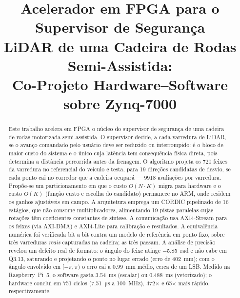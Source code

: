 \documentclass[conference]{IEEEtran}
\begin{document}
\title{Acelerador em FPGA para o Supervisor de Seguran\c{c}a\\
LiDAR de uma Cadeira de Rodas Semi-Assistida:\\
Co-Projeto Hardware--Software sobre Zynq-7000}

\author{
\and
{}
}

\maketitle

\begin{abstract}
Este trabalho acelera em FPGA o n\'ucleo do supervisor de seguran\c{c}a de uma
cadeira de rodas motorizada semi-assistida. O supervisor decide, a cada varredura
de LiDAR, se o avan\c{c}o comandado pelo usu\'ario deve ser reduzido ou
interrompido: \'e o bloco de maior custo do sistema e o \'unico cuja lat\^encia
tem consequ\^encia f\'isica direta, pois determina a dist\^ancia percorrida antes
da frenagem. O algoritmo projeta os \num{720} feixes da varredura no referencial
do ve\'iculo e testa, para \num{19} dire\c{c}\~oes candidatas de desvio, se cada
ponto cai no corredor que a cadeira ocupar\'a --- \num{9918} avalia\c{c}\~oes por
varredura. Prop\~oe-se um particionamento em que o custo $O(N\cdot K)$ migra para
hardware e o custo $O(K)$ (fun\c{c}\~ao custo e escolha do candidato) permanece no
ARM, onde residem os ganhos ajust\'aveis em campo. A arquitetura emprega um CORDIC
pipelinado de \num{16} est\'agios, que n\~ao consome multiplicadores, alimentando
\num{19} pistas paralelas cujas rota\c{c}\~oes t\^em coeficientes constantes de
s\'intese. A comunica\c{c}\~ao usa AXI4-Stream para os feixes (via AXI-DMA) e
AXI4-Lite para calibra\c{c}\~ao e resultados. A equival\^encia num\'erica foi
verificada bit a bit contra um modelo de refer\^encia em ponto fixo, sobre tr\^es
varreduras \emph{reais} capturadas na cadeira; as tr\^es passam. A an\'alise de
precis\~ao revelou um defeito real de formato: o \^angulo do feixe atinge
\SI{-5.85}{\radian} e n\~ao cabe em Q3.13, saturando e projetando o ponto no lugar
errado (erro de \SI{402}{\milli\metre}); com o \^angulo envolvido em
$[-\pi,\pi)$ o erro cai a \SI{0.99}{\milli\metre} m\'edio, cerca de um LSB. Medido
na Raspberry~Pi~5, o software gasta \SI{3.54}{\milli\second} (escalar) ou
\SI{0.488}{\milli\second} (vetorizado); o hardware conclui em \num{751} ciclos
(\SI{7.51}{\micro\second} a \SI{100}{\mega\hertz}), \num{472}$\times$ e
\num{65}$\times$ mais r\'apido, respectivamente.
\end{abstract}
\end{document}
